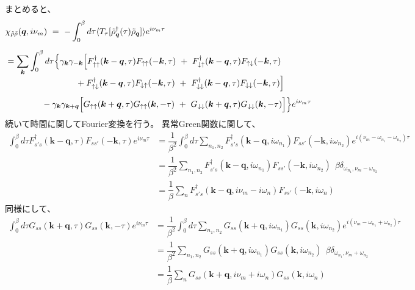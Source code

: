 \documentclass[a4j]{jsarticle}
\begin{document}
まとめると、
\begin{align}
	 &
	\chi_{\tilde{\rho} \tilde{\rho}}(\bm{q},i \nu_{m})
	\ = \
	-
	\int^{\beta}_{0} d \tau
	\langle T_{\tau}[ \tilde{\rho}_{\bm{q}}^{\dagger} (\tau) \tilde{\rho}_{\bm{q}} ] \rangle
	e^{i \nu_{m} \tau}
	\nonumber \\[2mm]
	 & =
	\sum_{ \bm{k} }
	\int^{\beta}_{0} d \tau
	\Big\{
	\gamma_{\bm{k}}
	\gamma_{-\bm{k}}
	\Big[
		F_{ \uparrow \uparrow }^{\dagger}( \bm{k} - \bm{q} , \tau )
		F_{ \uparrow \uparrow } ( - \bm{k} , \tau )
		\ + \
		F_{ \downarrow \uparrow }^{\dagger}( \bm{k} - \bm{q} , \tau )
		F_{ \uparrow \downarrow } ( - \bm{k} , \tau )
	\nonumber \\[-1mm] & \hspace{29mm} +
	F_{ \uparrow \downarrow }^{\dagger}( \bm{k} - \bm{q} , \tau )
	F_{ \downarrow \uparrow } ( - \bm{k} , \tau )
	\ + \
	F_{ \downarrow \downarrow }^{\dagger}( \bm{k} - \bm{q} , \tau )
	F_{ \downarrow \downarrow } ( - \bm{k} , \tau )
	\Big]
	\nonumber \\[1mm] & \hspace{15mm} -
	\gamma_{\bm{k}}
	\gamma_{\bm{k}+\bm{q}}
	\Big[
		G_{\uparrow \uparrow}( \bm{k}+\bm{q} , \tau)
		G_{\uparrow \uparrow}( \bm{k} , - \tau)
		\ + \
		G_{\downarrow \downarrow}( \bm{k}+\bm{q} , \tau)
		G_{\downarrow \downarrow}( \bm{k} , - \tau)
		\Big]
	\Big\}
	e^{i \nu_{m} \tau}
\end{align}
続いて時間に関してFourier変換を行う。
異常Green関数に関して、
\begin{align}
	\int^{\beta}_{0} d \tau
	F_{ s' s }^{\dagger}( \bm{k} - \bm{q} , \tau )
	F_{ s s' } ( - \bm{k} , \tau )
	e^{i \nu_{m} \tau}
	 & =
	\dfrac{1}{\beta^{2}}
	\int^{\beta}_{0} d \tau
	\sum_{n_{1},n_{2}}
	F_{ s' s }^{\dagger}( \bm{k} - \bm{q} , i \omega_{n_{1}} )
	F_{ s s' } ( - \bm{k} , i \omega_{n_{2}} )
	e^{i ( \nu_{m} - \omega_{n_{1}} - \omega_{n_{2}} ) \tau }
	\nonumber \\[2mm] &=
	\dfrac{ 1 }{\beta^{2}} \sum_{n_{1},n_{2}}
	F_{ s' s }^{\dagger}( \bm{k} - \bm{q} , i \omega_{n_{1}} )
	F_{ s s' } ( - \bm{k} , i \omega_{n_{2}} )
	\ \ \beta
	\delta_{ \omega_{n_{1}} , \nu_{m} - \omega_{n_{2}} }
	\nonumber \\[2mm] &=
	\dfrac{ 1 }{\beta} \sum_{n}
	F_{ s' s }^{\dagger}( \bm{k} - \bm{q} , i \nu_{m} - i \omega_{n} )
	F_{ s s' } ( - \bm{k} , i \omega_{n} )
\end{align}
同様にして、
\begin{align}
	\int^{\beta}_{0} d \tau
	G_{ s s } ( \bm{k} + \bm{q} , \tau )
	G_{ s s } ( \bm{k} , - \tau )
	e^{i \nu_{m} \tau}
	 & =
	\dfrac{1}{\beta^{2}}
	\int^{\beta}_{0} d \tau
	\sum_{n_{1},n_{2}}
	G_{ s s } ( \bm{k} + \bm{q} , i \omega_{n_{1}} )
	G_{ s s } ( \bm{k} , i \omega_{n_{2}} )
	e^{i ( \nu_{m} - \omega_{n_{1}} + \omega_{n_{2}} ) \tau }
	\nonumber \\[2mm] &=
	\dfrac{ 1 }{\beta^{2}} \sum_{n_{1},n_{2}}
	G_{ s s } ( \bm{k} + \bm{q} , i \omega_{n_{1}} )
	G_{ s s } ( \bm{k} , i \omega_{n_{2}} )
	\ \ \beta
	\delta_{ \omega_{n_{1}} , \nu_{m} + \omega_{n_{2}} }
	\nonumber \\[2mm] &=
	\dfrac{ 1 }{\beta} \sum_{n}
	G_{ s s } ( \bm{k} + \bm{q} , i \nu_{m} + i \omega_{n} )
	G_{ s s } ( \bm{k} , i \omega_{n} )
\end{align}
\end{document}
